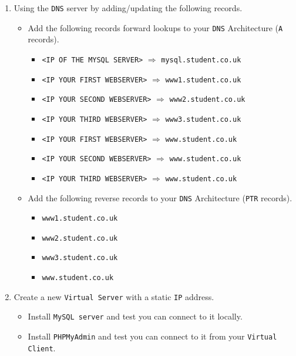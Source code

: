\documentclass[11pt]{article}
\begin{document}
\begin{enumerate}
    \item Using the \texttt{DNS} server by adding/updating the following records.
        \begin{itemize}
            \item Add the following records forward lookups to your \texttt{DNS} Architecture (\texttt{A} records).
                \begin{itemize}
                    \item \texttt{<IP OF THE MYSQL SERVER>} $\Rightarrow$ \texttt{mysql.student.co.uk}
                    \item \texttt{<IP YOUR FIRST WEBSERVER>} $\Rightarrow$ \texttt{www1.student.co.uk}
                    \item \texttt{<IP YOUR SECOND WEBSERVER>} $\Rightarrow$ \texttt{www2.student.co.uk}
                    \item \texttt{<IP YOUR THIRD WEBSERVER>} $\Rightarrow$ \texttt{www3.student.co.uk}
                    \item \texttt{<IP YOUR FIRST WEBSERVER>} $\Rightarrow$ \texttt{www.student.co.uk}
                    \item \texttt{<IP YOUR SECOND WEBSERVER>} $\Rightarrow$ \texttt{www.student.co.uk}
                    \item \texttt{<IP YOUR THIRD WEBSERVER>} $\Rightarrow$ \texttt{www.student.co.uk}
                \end{itemize}
            \item Add the following reverse records to your \texttt{DNS} Architecture (\texttt{PTR} records).
                \begin{itemize}
                    \item \texttt{www1.student.co.uk}
                    \item \texttt{www2.student.co.uk}
                    \item \texttt{www3.student.co.uk}
                    \item \texttt{www.student.co.uk}
                \end{itemize}
        \end{itemize}
    \item Create a new \texttt{Virtual Server} with a static \texttt{IP} address.
        \begin{itemize}
            \item Install \texttt{MySQL server} and test you can connect to it locally.
            \item Install \texttt{PHPMyAdmin} and test you can connect to it from your \texttt{Virtual Client}.

\end{itemize}
\end{enumerate}
\end{document}
